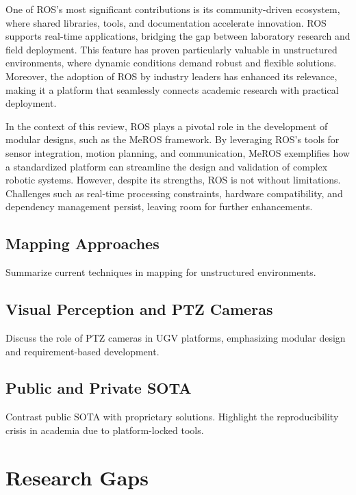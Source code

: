 \documentclass[runningheads]{llncs}
\begin{document}
One of ROS's most significant contributions is its community-driven ecosystem, where shared libraries, tools, and documentation accelerate innovation. ROS supports real-time applications, bridging the gap between laboratory research and field deployment. This feature has proven particularly valuable in unstructured environments, where dynamic conditions demand robust and flexible solutions. Moreover, the adoption of ROS by industry leaders has enhanced its relevance, making it a platform that seamlessly connects academic research with practical deployment.

In the context of this review, ROS plays a pivotal role in the development of modular designs, such as the MeROS framework. By leveraging ROS's tools for sensor integration, motion planning, and communication, MeROS exemplifies how a standardized platform can streamline the design and validation of complex robotic systems. However, despite its strengths, ROS is not without limitations. Challenges such as real-time processing constraints, hardware compatibility, and dependency management persist, leaving room for further enhancements.


\subsection{Mapping Approaches}
Summarize current techniques in mapping for unstructured environments.

\subsection{Visual Perception and PTZ Cameras}
Discuss the role of PTZ cameras in UGV platforms, emphasizing modular design and requirement-based development.

\subsection{Public and Private SOTA}
Contrast public SOTA with proprietary solutions. Highlight the reproducibility crisis in academia due to platform-locked tools.

\section{Research Gaps}
\end{document}
